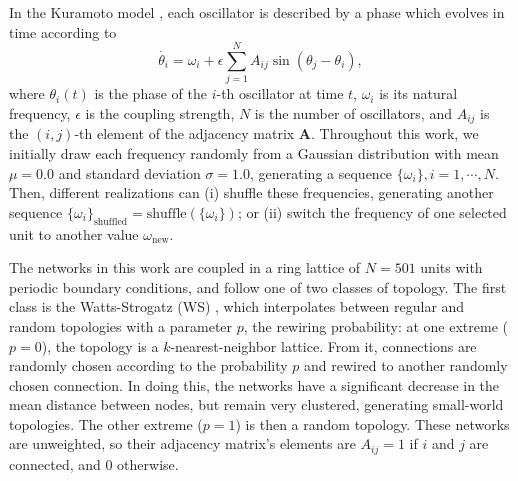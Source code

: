 In the Kuramoto model \cite{kuramoto1975self, kuramoto1984chemical}, each oscillator is described by a phase which evolves in time according to
%
\begin{equation}
    \Dot{\theta_{i}} = \omega_{i} + \epsilon \sum\limits_{j=1}^{N} A_{ij} \sin{(\theta_{j} - \theta_{i})},
    \label{eq:main_kuramoto}
\end{equation}
%
where $\theta_{i}(t)$ is the phase of the $i$-th oscillator at time $t$, $\omega_{i}$ is its natural frequency, $\epsilon$ is the coupling strength, $N$ is the number of oscillators, and $A_{ij}$ is the $(i,j)$-th element of the adjacency matrix $\mathbf{A}$. Throughout this work, we initially draw each frequency randomly from a Gaussian distribution with mean $\mu = 0.0$ and standard deviation $\sigma = 1.0$, generating a sequence $\{\omega_{i}\}, i=1,\cdots,N$. Then, different realizations can (i) shuffle these frequencies, generating another sequence $\{\omega_{i}\}_{\mathrm{shuffled}} = \mathrm{shuffle}(\{\omega_{i}\})$; or (ii) switch the frequency of one selected unit to another value $\omega_{\mathrm{new}}$. 

The networks in this work are coupled in a ring lattice of $N=501$ units with periodic boundary conditions, and follow one of two classes of topology. 
The first class is the Watts-Strogatz (WS) \cite{watts1998collective}, which interpolates between regular and random topologies with a parameter $p$, the rewiring probability: at one extreme ($p = 0$), the topology is a $k$-nearest-neighbor lattice. From it, connections are randomly chosen according to the probability $p$ and rewired to another randomly chosen connection. In doing this, the networks have a significant decrease in the mean distance between nodes, but remain very clustered, generating small-world topologies. The other extreme ($p = 1$) is then a random topology. These networks are unweighted, so their adjacency matrix's elements are $A_{ij} = 1$ if $i$ and $j$ are connected, and $0$ otherwise.

